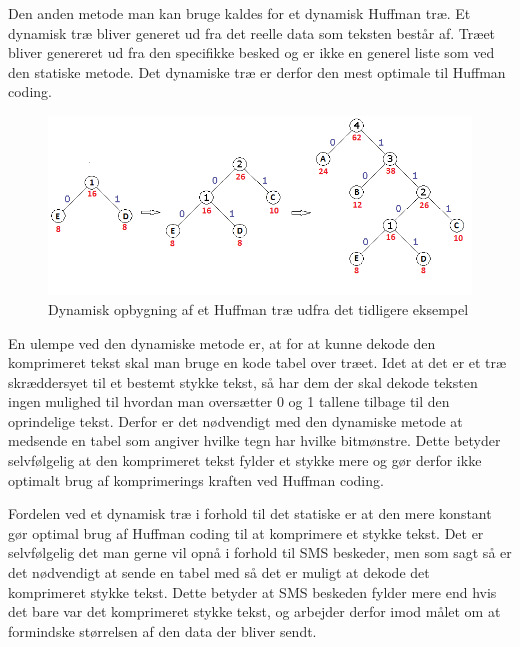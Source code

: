 Den anden metode man kan bruge kaldes for et dynamisk Huffman træ. Et dynamisk træ bliver generet ud fra det reelle data som teksten består af. Træet bliver genereret ud fra den specifikke besked og er ikke en generel liste som ved den statiske metode. Det dynamiske træ er derfor den mest optimale til Huffman coding.

\begin{figure}[H]
\centering
\includegraphics[width=\linewidth]{Billeder/dynamisk.png}
\caption{Dynamisk opbygning af et Huffman træ udfra det tidligere eksempel}
\label{fig:dynamic_tree}
\end{figure}

En ulempe ved den dynamiske metode er, at for at kunne dekode den komprimeret tekst  skal man bruge en kode tabel over træet. Idet at det er et træ skræddersyet til et bestemt stykke tekst, så har dem der skal dekode teksten ingen mulighed til hvordan man oversætter 0 og 1 tallene tilbage til den oprindelige tekst. Derfor er det nødvendigt med den dynamiske metode at medsende en tabel som angiver hvilke tegn har hvilke bitmønstre. Dette betyder selvfølgelig at den komprimeret tekst fylder et stykke mere og gør derfor ikke optimalt brug af komprimerings kraften ved Huffman coding. \cite{Hufftree_4}

Fordelen ved et dynamisk træ i forhold til det statiske er at den mere konstant gør optimal brug af Huffman coding til at komprimere et stykke tekst. Det er selvfølgelig det man gerne vil opnå i forhold til SMS beskeder, men som sagt så er det nødvendigt at sende en tabel med så det er muligt at dekode det komprimeret stykke tekst. Dette betyder at SMS beskeden fylder mere end hvis det bare var det komprimeret stykke tekst, og arbejder derfor imod målet om at formindske størrelsen af den data der bliver sendt.
